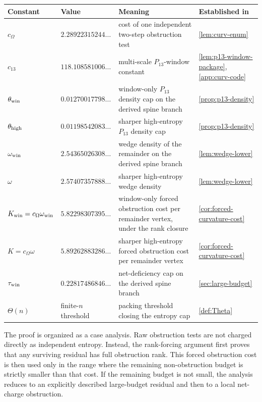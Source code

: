 \documentclass[11pt]{article}
\begin{document}
\begin{center}\small
\begin{tabular}{L{0.17\textwidth} L{0.18\textwidth} L{0.37\textwidth} L{0.18\textwidth}}
\toprule
Constant & Value & Meaning & Established in \\
\midrule
$c_\Omega$ & $2.28922315244\ldots$ & cost of one independent two-step obstruction test & \cref{lem:curv-enum} \\
$c_{13}$ & $118.108581006\ldots$ & multi-scale $P_{13}$-window constant & \cref{lem:p13-window-package}, \cref{app:curv-code} \\
$\theta_{\rm win}$ & $0.01270017798\ldots$ & window-only $P_{13}$ density cap on the derived spine branch & \cref{prop:p13-density} \\
$\theta_{\rm high}$ & $0.01198542083\ldots$ & sharper high-entropy $P_{13}$ density cap & \cref{prop:p13-density} \\
$\omega_{\rm win}$ & $2.54365026308\ldots$ & wedge density of the remainder on the derived spine branch & \cref{lem:wedge-lower} \\
$\omega$ & $2.57407357888\ldots$ & sharper high-entropy wedge density & \cref{lem:wedge-lower} \\
$K_{\rm win}=c_\Omega\omega_{\rm win}$ & $5.82298307395\ldots$ & window-only forced obstruction cost per remainder vertex, under the rank closure & \cref{cor:forced-curvature-cost} \\
$K=c_\Omega\omega$ & $5.89262883286\ldots$ & sharper high-entropy forced obstruction cost per remainder vertex & \cref{cor:forced-curvature-cost} \\
$\tau_{\rm win}$ & $0.22817486846\ldots$ & net-deficiency cap on the derived spine branch & \cref{sec:large-budget} \\
$\Theta(n)$ & finite-$n$ threshold & packing threshold closing the entropy cap & \cref{def:Theta} \\
\bottomrule
\end{tabular}
\end{center}
The proof is organized as a case analysis.  Raw obstruction tests are not charged directly as independent entropy.  Instead, the rank-forcing argument first proves that any surviving residual has full obstruction rank.  This forced obstruction cost is then used only in the range where the remaining non-obstruction budget is strictly smaller than that cost.  If the remaining budget is not small, the analysis reduces to an explicitly described large-budget residual and then to a local net-charge obstruction.
\end{document}
